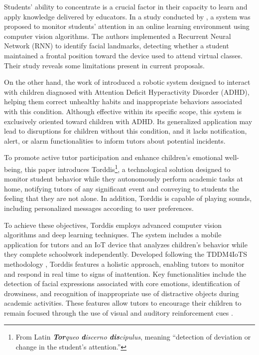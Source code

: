 		Students' ability to concentrate is a crucial factor in their capacity to learn and apply knowledge delivered by educators. In a study conducted by \cite{Terraza2022}, a system was proposed to monitor students’ attention in an online learning environment using computer vision algorithms. The authors implemented a Recurrent Neural Network (RNN) to identify facial landmarks, detecting whether a student maintained a frontal position toward the device used to attend virtual classes. Their study reveals some limitations present in current proposals.
		
		On the other hand, the work of \cite{Berrezueta-Guzman2021} introduced a robotic system designed to interact with children diagnosed with Attention Deficit Hyperactivity Disorder (ADHD), helping them correct unhealthy habits and inappropriate behaviors associated with this condition. Although effective within its specific scope, this system is exclusively oriented toward children with ADHD. Its generalized application may lead to disruptions for children without this condition, and it lacks notification, alert, or alarm functionalities to inform tutors about potential incidents.
		
		To promote active tutor participation and enhance children’s emotional well-being, this paper introduces Torddis\footnote{From Latin \textit{\textbf{Tor}queo \textbf{d}iscerno \textbf{dis}cipulus}, meaning ``detection of deviation or change in the student’s attention.''}, a technological solution designed to monitor student behavior while they autonomously perform academic tasks at home, notifying tutors of any significant event and conveying to students the feeling that they are not alone. In addition, Torddis is capable of playing sounds, including personalized messages according to user preferences.
		
		To achieve these objectives, Torddis employs advanced computer vision algorithms and deep learning techniques. The system includes a mobile application for tutors and an IoT device that analyzes children's behavior while they complete schoolwork independently. Developed following the TDDM4IoTS methodology \citep{Guerrero-Ulloa2020TDDM4IoTS}, Torddis features a holistic approach, enabling tutors to monitor and respond in real time to signs of inattention. Key functionalities include the detection of facial expressions associated with core emotions, identification of drowsiness, and recognition of inappropriate use of distractive objects during academic activities. These features allow tutors to encourage their children to remain focused through the use of visual and auditory reinforcement cues \citep{Al-Gburi2023,Enadula2021,Terraza2022}.
		
